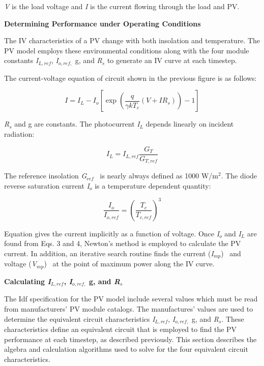 \emph{V} is the load voltage and \emph{I} is the current flowing through the load and PV.

\textbf{Determining Performance under Operating Conditions}

The IV characteristics of a PV change with both insolation and temperature. The PV model employs these environmental conditions along with the four module constants \emph{I\(_{L,ref}\)}, \emph{I\(_{o,ref,}\)} g, and \emph{R\(_{s}\)} to generate an IV curve at each timestep.

The current-voltage equation of circuit shown in the previous figure is as follows:

\begin{equation}
I = {I_L} - {I_o}\left[ {\exp \left( {\frac{q}{{\gamma k{T_c}}}\left( {V + I{R_s}} \right)} \right) - 1} \right]
\end{equation}

\emph{R\(_{s}\)} and g are constants. The photocurrent \emph{I\(_{L}\)} depends linearly on incident radiation:

\begin{equation}
{I_L} = {I_{L,ref}}\frac{{{G_T}}}{{{G_{T,ref}}}}
\end{equation}

The reference insolation \emph{G\(_{ref}\)} ~is nearly always defined as 1000 W/m\(^{2}\). The diode reverse saturation current \emph{I\(_{o}\)} is a temperature dependent quantity:

\begin{equation}
\frac{{{I_o}}}{{{I_{o,ref}}}} = {\left( {\frac{{{T_c}}}{{{T_{c,ref}}}}} \right)^3}
\end{equation}

Equation gives the current implicitly as a function of voltage. Once \emph{I\(_{o}\)} and \emph{I\(_{L}\)} are found from Eqs. 3 and 4, Newton's method is employed to calculate the PV current. In addition, an iterative search routine finds the current (\emph{I\(_{mp}\)}) ~and voltage (\emph{V\(_{mp}\)})~ at the point of maximum power along the IV curve.

\textbf{Calculating \emph{I\(_{L,ref}\)}, \emph{I\(_{o,ref,}\)}} \textbf{g, and \emph{R\(_{s}\)}}

The Idf specification for the PV model include several values which must be read from manufacturers' PV module catalogs. The manufactures' values are used to determine the equivalent circuit characteristics \emph{I\(_{L,ref}\)}, \emph{I\(_{o,ref,}\)} g, and \emph{R\(_{s}\)}. These characteristics define an equivalent circuit that is employed to find the PV performance at each timestep, as described previously. This section describes the algebra and calculation algorithms used to solve for the four equivalent circuit characteristics.

